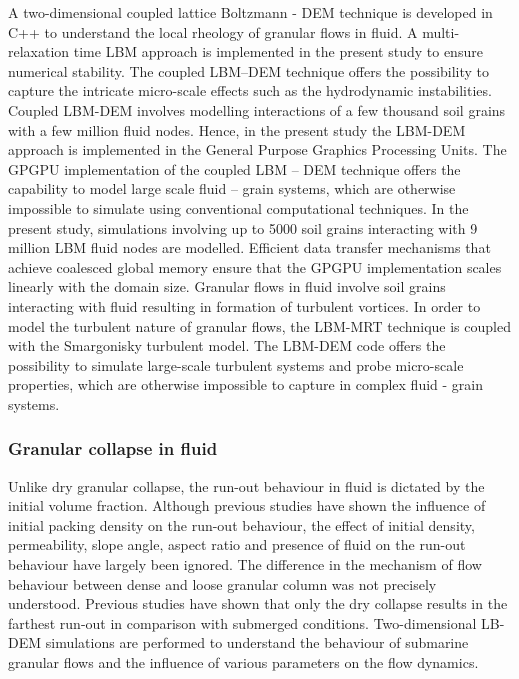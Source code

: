 A two-dimensional coupled lattice Boltzmann - DEM technique is developed in C++ 
to understand the local rheology of granular flows in fluid. A multi-relaxation 
time LBM approach is implemented in the present study to ensure numerical 
stability. The coupled LBM--DEM technique offers the possibility to capture the 
intricate micro-scale effects such as the hydrodynamic instabilities. Coupled 
LBM-DEM involves modelling interactions of a few thousand soil grains with a 
few million fluid nodes. Hence, in the present study the LBM-DEM approach is 
implemented in the General Purpose Graphics Processing Units. The GPGPU 
implementation of the coupled LBM -- DEM technique offers the capability to 
model large scale fluid -- grain systems, which are otherwise impossible to 
simulate using conventional computational techniques. In the present study, 
simulations involving up to 5000 soil grains interacting with 9 million LBM 
fluid nodes are modelled. Efficient data transfer mechanisms that achieve 
coalesced global memory ensure that the GPGPU implementation scales linearly 
with the domain size. Granular flows in fluid involve soil grains interacting 
with fluid resulting in formation of turbulent vortices. In order to model the 
turbulent nature of granular flows, the LBM-MRT technique is coupled with the 
Smargonisky turbulent model. The LBM-DEM code offers the possibility to 
simulate large-scale turbulent systems and probe micro-scale properties, which 
are otherwise impossible to capture in complex fluid - grain systems.

\subsubsection*{Granular collapse in fluid}

Unlike dry granular collapse, the run-out 
behaviour in fluid is dictated by the initial volume fraction. Although 
previous studies have shown the influence of initial packing density on the 
run-out behaviour, the effect of initial density, permeability, slope angle, 
aspect ratio and presence of fluid on the run-out behaviour have largely been 
ignored. The difference in the mechanism of flow behaviour between 
dense and loose granular column was not precisely understood. Previous studies 
have shown that only the dry collapse results in the farthest run-out in 
comparison with submerged conditions. Two-dimensional LB-DEM simulations are 
performed to understand the behaviour of submarine granular flows and the 
influence of various parameters on the flow dynamics.

